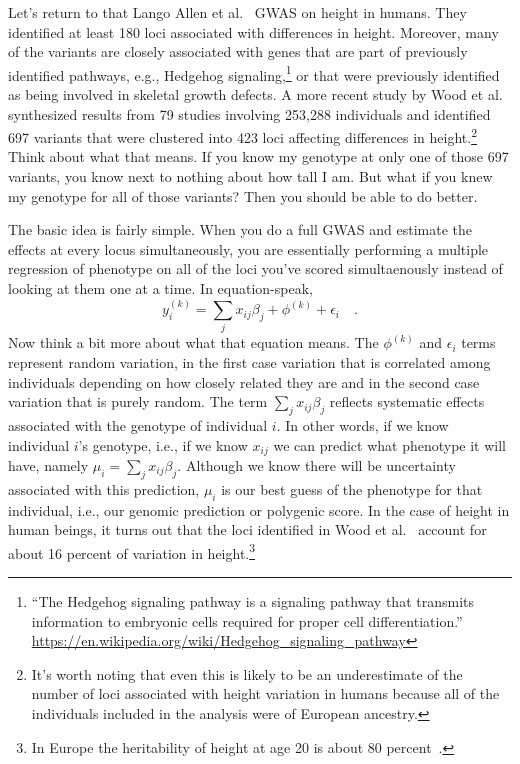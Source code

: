 Let's return to that Lango Allen et al.~\cite{LangoAllen-etal-2010}
GWAS on height in humans. They identified at least 180 loci associated
with differences in height. Moreover, many of the variants are closely
associated with genes that are part of previously identified pathways,
e.g., Hedgehog signaling,\footnote{``The Hedgehog signaling pathway is
  a signaling pathway that transmits information to embryonic cells
  required for proper cell differentiation.''
  \url{https://en.wikipedia.org/wiki/Hedgehog_signaling_pathway}} or
that were previously identified as being involved in skeletal growth
defects. A more recent study by Wood et al.~\cite{Wood-etal-2014}
synthesized results from 79 studies involving 253,288 individuals and
identified 697 variants that were clustered into 423 loci affecting
differences in height.\footnote{It's worth noting that even this is
  likely to be an underestimate of the number of loci associated with
  height variation in humans because all of the individuals included
  in the analysis were of European ancestry.} Think about what that
means. If you know my genotype at only one of those 697 variants, you
know next to nothing about how tall I am. But what if you knew my
genotype for all of those variants? Then you should be able to do
better.

The basic idea is fairly simple. When you do a full GWAS and estimate
the effects at every locus simultaneously, you are essentially
performing a multiple regression of phenotype on all of the loci
you've scored simultaenously instead of looking at them one at a
time. In equation-speak,
\[
y_i^{(k)} = \sum_j x_{ij}\beta_j + \phi^{(k)} + \epsilon_i \quad .
\]
Now think a bit more about what that equation means. The $\phi^{(k)}$
and $\epsilon_i$ terms represent random variation, in the first case
variation that is correlated among individuals depending on how
closely related they are and in the second case variation that is
purely random. The term $\sum_j x_{ij}\beta_j$ reflects systematic
effects associated with the genotype of individual $i$. In other
words, if we know individual $i$'s genotype, i.e., if we know $x_{ij}$
we can predict what phenotype it will have, namely
$\mu_i = \sum_j x_{ij}\beta_j$. Although we know there will be
uncertainty associated with this prediction, $\mu_i$ is our best guess
of the phenotype for that individual, i.e., our genomic prediction or
polygenic score. In the case of height in human beings, it turns out
that the loci identified in Wood et al.~\cite{Wood-etal-2014} account
for about 16 percent of variation in height.\footnote{In Europe the
  heritability of height at age 20 is about 80
  percent~\cite{Jelenkovic-etal-2016}.}

